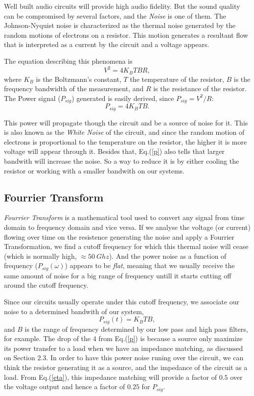 \documentclass{article}
\begin{document}
{Well built audio circuits will provide high audio fidelity. But the
sound quality can be compromised by several factors, and the
\emph{Noise} is one of them. The Johnson-Nyquist noise is characterized as the 
thermal noise generated by the random motions of electrons on a resistor. This motion
generates a resultant flow that is interpreted as a current by the
circuit and a voltage appears. 

The equation describing this phenomena is 
\begin{equation}
V^{2}=4K_{B}TBR,
\label{v}
\end{equation}
where $K_{B}$ is the Boltzmann’s constant, $T$ the temperature of the
resistor, $B$ is the frequency bandwidth of the measurement, 
and $R$ is the resistance of the resistor. The Power signal ($P_{sig}$)
generated is easily derived, since $P_{sig}=V^{2}/R$:
\begin{equation}
P_{sig}=4K_{B}TB.
\label{p}
\end{equation}

This power will propagate though the circuit and be a source of noise
for it. This is also known as the \emph{White Noise} of the circuit, and
since the random motion of electrons is proportional to the temperature on the resistor,
the higher it is more voltage will appear through it. Besides that,
Eq.(\ref{p}) also tells that larger bandwith will increase the noise. So
a way to reduce it is by either cooling the resistor or working with a
smaller bandwith on our systems.

\subsection{Fourrier Transform}

\emph{Fourrier Transform} is a mathematical tool used to convert any
signal from time domain to frequency domain and vice versa.
If we analyse the voltage (or current) flowing over time on the resistence generating the
noise and apply a Fourrier Transformation, we find a cutoff frequency
for which this thermal noise will cease (which is normally high,
$\approx50 \ Ghz$). And the power noise as a
function of frequency ($P_{sig}(\omega)$) appears to be \emph{flat}, meaning that
we usually receive the same amount of noise for a big range of
frequency untill it starts cutting off around the cutoff frequency.

Since our circuits usually operate under this cutoff frequency, we
associate our noise to a determined bandwith of our system,
\begin{equation}
P_{sig}(t)=K_{B}TB,
\label{last}
\end{equation}
and $B$ is the range of frequency determined by our low pass and high
pass filters, for example. The drop of the $4$ from Eq.(\ref{p}) is
because a source only maximize its power transfer to a load when we have an impedance
matching, as discussed on Section 2.3. In order to have this power noise
runing over the circuit, we can think the resistor generating it as a
source, and the impedance of the circuit as a load. From Eq.(\ref{eta}),
this impedance matching will provide a factor of $0.5$ over the voltage
output and hence a factor of $0.25$ for $P_{sig}$.

}
\end{document}
